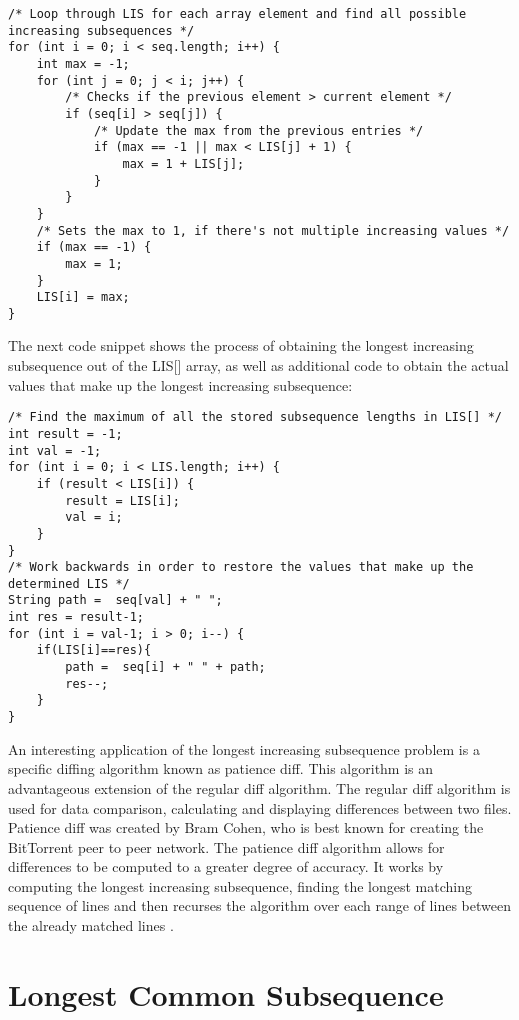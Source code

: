 \begin{lstlisting}
/* Loop through LIS for each array element and find all possible increasing subsequences */
for (int i = 0; i < seq.length; i++) {
	int max = -1;
	for (int j = 0; j < i; j++) {
		/* Checks if the previous element > current element */
		if (seq[i] > seq[j]) {
			/* Update the max from the previous entries */
			if (max == -1 || max < LIS[j] + 1) {
				max = 1 + LIS[j];
			}
		}
	}
	/* Sets the max to 1, if there's not multiple increasing values */
	if (max == -1) {
		max = 1;
	}
	LIS[i] = max;
}
\end{lstlisting}

\smallbreak\noindent
The next code snippet shows the process of obtaining the longest increasing subsequence out of the LIS[] array, as well as additional code to obtain the actual values that make up the longest increasing subsequence:

\begin{lstlisting}
/* Find the maximum of all the stored subsequence lengths in LIS[] */
int result = -1;
int val = -1;
for (int i = 0; i < LIS.length; i++) {
	if (result < LIS[i]) {
		result = LIS[i];
		val = i;
	}
}
/* Work backwards in order to restore the values that make up the determined LIS */
String path =  seq[val] + " ";
int res = result-1;
for (int i = val-1; i > 0; i--) {
	if(LIS[i]==res){
		path =  seq[i] + " " + path;
		res--;
	}           
}
\end{lstlisting}



An interesting application of the longest increasing subsequence problem is a specific diffing algorithm known as patience diff. This algorithm is an advantageous extension of the regular diff algorithm. The regular diff algorithm is used for data comparison, calculating and displaying differences between two files. Patience diff was created by Bram Cohen, who is best known for creating the BitTorrent peer to peer network. The patience diff algorithm allows for differences to be computed to a greater degree of accuracy. It works by computing the longest increasing subsequence, finding the longest matching sequence of lines and then recurses the algorithm over each range of lines between the already matched lines \cite{patience-diff}.



\section{Longest Common Subsequence}

